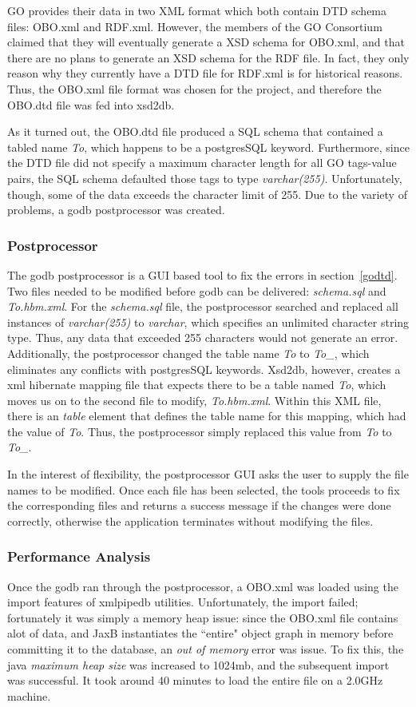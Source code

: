 GO provides their data in two XML format which both contain DTD schema files: OBO.xml and RDF.xml. However,
the members of the GO Consortium claimed that they will eventually generate a XSD schema for OBO.xml, and that there
are no plans to generate an XSD schema for the RDF file. In fact, they only reason why they currently have a DTD file
for RDF.xml is for historical reasons. Thus, the OBO.xml file format
was chosen for the project, and therefore the OBO.dtd file was fed into xsd2db.

As it turned out, the OBO.dtd file produced a SQL schema that contained a tabled name \emph{To}, which happens to be
a postgresSQL keyword. Furthermore, since the DTD file did not specify a maximum character length for all GO tags-value
pairs, the SQL schema defaulted those tags to type \emph{varchar(255)}. Unfortunately, though, some of the data exceeds the
character limit of 255. Due to the variety of problems, a godb postprocessor was created.

\subsubsection{Postprocessor}
The godb postprocessor is a GUI based tool to fix the errors in section~\ref{godtd}. Two files needed to be modified  before
godb can be delivered: \emph{schema.sql} and \emph{To.hbm.xml}. For the \emph{schema.sql} file, the postprocessor
searched and replaced all instances of \emph{varchar(255)} to \emph{varchar}, which specifies an unlimited character string type.
Thus, any data that exceeded 255 characters would not generate an error. Additionally,
the postprocessor changed the table name \emph{To} to  \emph{To\_}, which eliminates any conflicts with postgresSQL keywords.
Xsd2db, however,
creates a xml hibernate mapping file that expects there to be a table named \emph{To}, which moves us on to the second file to modify,
\emph{To.hbm.xml}. Within this XML file, there is an \emph{table} element that defines the table name for this mapping, which had the
value of \emph{To}. Thus, the postprocessor simply replaced this value from \emph{To} to \emph{To\_}.

In the interest of flexibility, the postprocessor GUI asks the user to supply the file names to be modified.
Once each file has been selected, the tools proceeds to fix the corresponding files and returns a success message
if the changes were done correctly, otherwise the application terminates without modifying the files.

\subsubsection{Performance Analysis}
Once the godb ran through the postprocessor, a OBO.xml was loaded using the import features of xmlpipedb utilities.
Unfortunately, the import failed; fortunately it was simply a memory heap issue: since the OBO.xml file contains alot of data, and
JaxB instantiates the ``entire" object graph in memory before committing it to the database, an \emph{out of memory} error was issue.
To fix this, the java \emph{maximum heap size} was increased to 1024mb, and the subsequent import was successful. It took
around 40 minutes to load the entire file on a 2.0GHz machine.


